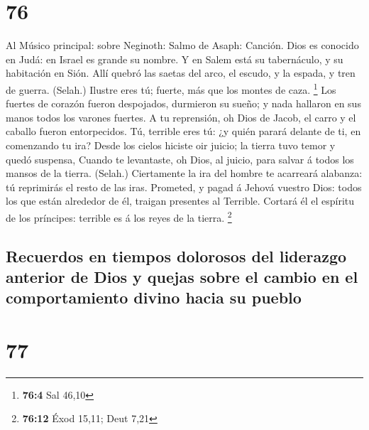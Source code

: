 \hypertarget{section-75}{%
\section{76}\label{section-75}}

 Al Músico principal: sobre Neginoth: Salmo de Asaph:
Canción. Dios es conocido en Judá: en Israel es grande su nombre.
 Y en Salem está su tabernáculo, y su habitación en Sión.
 Allí quebró las saetas del arco, el escudo, y la espada, y
tren de guerra. (Selah.)  Ilustre eres tú; fuerte, más que
los montes de caza. \footnote{\textbf{76:4} Sal 46,10}  Los
fuertes de corazón fueron despojados, durmieron su sueño; y nada
hallaron en sus manos todos los varones fuertes.  A tu
reprensión, oh Dios de Jacob, el carro y el caballo fueron entorpecidos.
 Tú, terrible eres tú: ¿y quién parará delante de ti, en
comenzando tu ira?  Desde los cielos hiciste oir juicio; la
tierra tuvo temor y quedó suspensa,  Cuando te levantaste,
oh Dios, al juicio, para salvar á todos los mansos de la tierra.
(Selah.)  Ciertamente la ira del hombre te acarreará
alabanza: tú reprimirás el resto de las iras.  Prometed, y
pagad á Jehová vuestro Dios: todos los que están alrededor de él,
traigan presentes al Terrible.  Cortará él el espíritu de
los príncipes: terrible es á los reyes de la tierra. \footnote{\textbf{76:12}
  Éxod 15,11; Deut 7,21}

\hypertarget{recuerdos-en-tiempos-dolorosos-del-liderazgo-anterior-de-dios-y-quejas-sobre-el-cambio-en-el-comportamiento-divino-hacia-su-pueblo}{%
\subsection{Recuerdos en tiempos dolorosos del liderazgo anterior de
Dios y quejas sobre el cambio en el comportamiento divino hacia su
pueblo}\label{recuerdos-en-tiempos-dolorosos-del-liderazgo-anterior-de-dios-y-quejas-sobre-el-cambio-en-el-comportamiento-divino-hacia-su-pueblo}}

\hypertarget{section-76}{%
\section{77}\label{section-76}}

